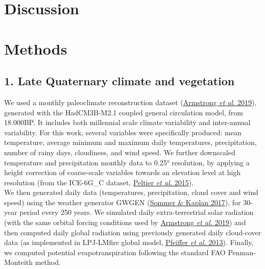 \documentclass[11pt,]{article}
\begin{document}
\hypertarget{discussion}{%
\section{Discussion}\label{discussion}}

\hypertarget{methods}{%
\section{Methods}\label{methods}}

\hypertarget{late-quaternary-climate-and-vegetation}{%
\subsection{1. Late Quaternary climate and
vegetation}\label{late-quaternary-climate-and-vegetation}}

We used a monthly paleoclimate reconstruction dataset
(\protect\hyperlink{ref-Armstrong2019}{Armstrong \emph{et al.} 2019}),
generated with the HadCM3B-M2.1 coupled general circulation model, from
18.000BP. It includes both millennial scale climate variability and
inter-annual variability. For this work, several variables were
specifically produced: mean temperature, average minimum and maximum
daily temperatures, precipitation, number of rainy days, cloudiness, and
wind speed. We further downscaled temperature and precipitation monthly
data to 0.25° resolution, by applying a height correction of
coarse-scale variables towards an elevation level at high resolution
(from the ICE-6G\_C dataset, \protect\hyperlink{ref-Peltier2015}{Peltier
\emph{et al.} 2015}).\\
We then generated daily data (temperatures, precipitation, cloud cover
and wind speed) using the weather generator GWGEN
(\protect\hyperlink{ref-Sommer2017}{Sommer \& Kaplan 2017}), for 30-year
period every 250 years. We simulated daily extra-terrestrial solar
radiation (with the same orbital forcing conditions used by
\protect\hyperlink{ref-Armstrong2019}{Armstrong \emph{et al.} 2019}) and
then computed daily global radiation using previously generated daily
cloud-cover data (as implemented in LPJ-LMfire global model,
\protect\hyperlink{ref-Pfeiffer2013}{Pfeiffer \emph{et al.} 2013}).
Finally, we computed potential evapotranspiration following the standard
FAO Penman-Monteith method.
\end{document}
